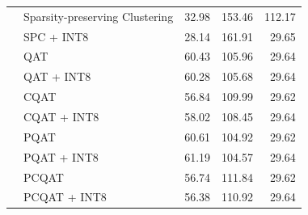 \begin{table}[htbp]
{\begin{tabular}{llrrr}
  & Sparsity-preserving Clustering & 32.98 & 153.46 & 112.17 \\
  & SPC + INT8 & 28.14 & 161.91 & 29.65 \\
  & QAT & 60.43 & 105.96 & 29.64 \\
  & QAT + INT8 & 60.28 & 105.68 & 29.64 \\
  & CQAT & 56.84 & 109.99 & 29.62 \\
  & CQAT + INT8 & 58.02 & 108.45 & 29.64 \\
  & PQAT & 60.61 & 104.92 & 29.62 \\
  & PQAT + INT8 & 61.19 & 104.57 & 29.64 \\
  & PCQAT & 56.74 & 111.84 & 29.62 \\
  & PCQAT + INT8 & 56.38 & 110.92 & 29.64 \\
\bottomrule
\end{tabular}%
}
\end{table}